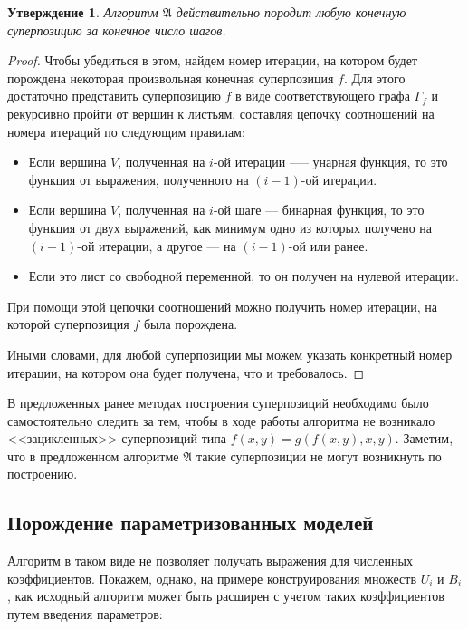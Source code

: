\documentclass[12pt,a4paper]{amsart}
\newtheorem{stat}{Утверждение}
\begin{document}
\begin{stat}
  Алгоритм $\mathfrak{A}$ действительно породит любую конечную суперпозицию
  за конечное число шагов.
\end{stat}
\begin{proof}
  Чтобы убедиться в этом, найдем номер итерации, на котором будет порождена
  некоторая произвольная конечная суперпозиция $f$. Для этого достаточно
  представить суперпозицию $f$ в виде соответствующего графа $\Gamma_f$
  и рекурсивно пройти от вершин к листьям, составляя цепочку соотношений
  на номера итераций по следующим правилам:

  \begin{itemize}
	\item Если вершина $V$, полученная на $i$-ой итерации —-- унарная функция,
	  то это функция от выражения, полученного на $(i-1)$-ой итерации.
	\item Если вершина $V$, полученная на $i$-ой шаге --- бинарная функция, то
	  это функция от двух выражений, как минимум одно из которых получено
	  на $(i-1)$-ой итерации, а другое --- на $(i-1)$-ой или ранее.
	\item Если это лист со свободной переменной, то он получен на нулевой
	  итерации.
  \end{itemize}

  При помощи этой цепочки соотношений можно получить номер итерации, на
  которой суперпозиция $f$ была порождена.
  
  Иными словами, для любой суперпозиции мы можем указать конкретный номер
  итерации, на котором она будет получена, что и требовалось.
\end{proof}

В предложенных ранее методах\cite{Zelinka2008} построения суперпозиций
необходимо было самостоятельно следить за тем, чтобы в ходе работы алгоритма
не возникало <<зацикленных>> суперпозиций типа $f(x, y) = g (f(x, y), x, y)$.
Заметим, что в предложенном алгоритме $\mathfrak{A}$ такие суперпозиции
не могут возникнуть по построению.

\subsection{Порождение параметризованных моделей}
Алгоритм в таком виде не позволяет получать выражения для численных
коэффициентов. Покажем, однако, на примере конструирования множеств
$U_i$ и $B_i$, как исходный алгоритм может быть расширен с учетом
таких коэффициентов путем введения параметров:
\end{document}
